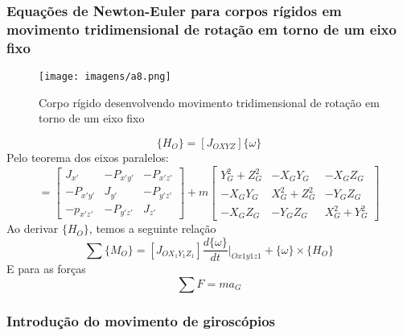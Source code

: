 \documentclass[a4paper, 12pt]{article}
\begin{document}
	\subsubsection{Equações de Newton-Euler para corpos rígidos em movimento tridimensional de rotação em torno de um eixo fixo}
		\begin{figure}[h]
			\center
			\texttt{[image: imagens/a8.png]} 
			\caption{Corpo rígido desenvolvendo movimento tridimensional de rotação em torno de um eixo fixo}
		\end{figure}
		\begin{equation}
			\{H_O\} = [J_{OXYZ}]\{\omega \}
		\end{equation}
		Pelo teorema dos eixos paralelos:
		\begin{equation}
			[J_{OXYZ}] = \begin{bmatrix}
			J_{x'} & -P_{x'y'} & -P_{x'z'}\\
			-P_{x'y'} & J_{y'} & -P_{y'z'}\\
			-p_{x'z'} & -P_{y'z'} & J_{z'}
			\end{bmatrix} + m\begin{bmatrix}
			 Y_G^2 + Z^2_G & -X_GY_G & -X_GZ_G\\
			 -X_GY_G & X^2_G+Z^2_G & -Y_GZ_G\\
			 -X_GZ_G & -Y_GZ_G & X^2_G + Y_G^2
			\end{bmatrix}
		\end{equation}
		Ao derivar $\{H_O\}$, temos a seguinte relação
		\begin{equation}
			\sum \{M_O\} = [J_{OX_1Y_1Z_1}]\frac{d\{\omega \}}{dt}|_{Ox1y1z1} + \{\omega \} \times \{H_O\}
		\end{equation}
		E para as forças
		\begin{equation}
			\sum F = ma_G
		\end{equation}

		\subsubsection{Introdução do movimento de giroscópios}
\end{document}
